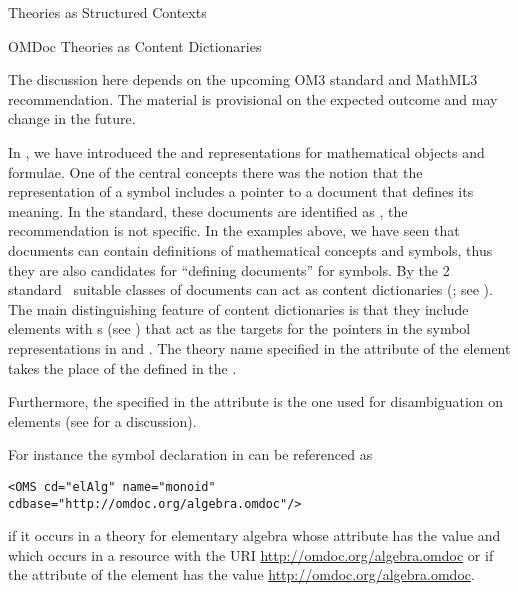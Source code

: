\begin{omgroup}[short=Mathematical Statements,id=statements]
\begin{omgroup}[id=theories-contexts]{Theories as Structured Contexts}
\begin{module}[id=theories]
\begin{omgroup}[id=identifying]{OMDoc Theories as Content Dictionaries}
\begin{oldpart}{The discussion here depends on the upcoming OM3 standard and MathML3
    recommendation. The material is provisional on the expected outcome and may change in
    the future.}
\begin{omtext}
  In {}, we have introduced the {\openmath} and {\cmathml} representations for
  mathematical objects and formulae. One of the central concepts there was the notion that
  the representation of a symbol includes a pointer to a document that defines its
  meaning.  In the {\openmath} standard, these documents are identified as
  , the
  {\mathml} recommendation is not specific.  In the examples above, we have seen that
  \omdoc documents can contain definitions of mathematical concepts and symbols, thus
  they are also candidates for ``defining documents'' for symbols.  By the {\openmath}2
  standard~\cite{BusCapCar:2oms04} suitable classes of \omdoc documents can act as
  {\openmath} content dictionaries (; see {}).  The main
  distinguishing feature of \omdoc content dictionaries is that they include
   elements with {s} (see
  {}) that act as the targets for the pointers in the symbol
  representations in {\openmath} and {\cmathml}. The theory name specified in the
   attribute of the  element takes
  the place of the {} defined in the .
\end{omtext}

Furthermore, the {} specified in the  attribute
is the one used for disambiguation on  elements (see
{} for a discussion).
  
For instance the symbol declaration in {} can be referenced as
\begin{lstlisting}
<OMS cd="elAlg" name="monoid" cdbase="http://omdoc.org/algebra.omdoc"/>
\end{lstlisting}
if it occurs in a theory for elementary algebra whose
 attribute has the value {} and which
occurs in a resource with the URI \url{http://omdoc.org/algebra.omdoc} or if the
 attribute of the  element has the value
\url{http://omdoc.org/algebra.omdoc}.


\end{oldpart}
\end{omgroup}
\end{module}
\end{omgroup}
\end{omgroup}

